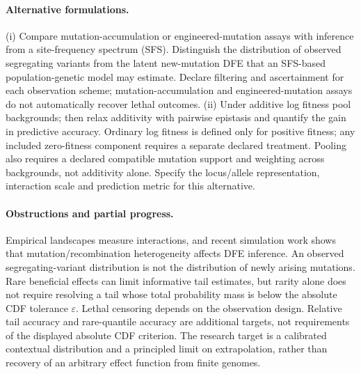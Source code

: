 \documentclass[11pt]{article}
\begin{document}
\paragraph{Alternative formulations.} (i) Compare mutation-accumulation or engineered-mutation assays with inference from a site-frequency spectrum (SFS). Distinguish the distribution of observed segregating variants from the latent new-mutation DFE that an SFS-based population-genetic model may estimate. Declare filtering and ascertainment for each observation scheme; mutation-accumulation and engineered-mutation assays do not automatically recover lethal outcomes. (ii) Under additive log fitness pool backgrounds; then relax additivity with pairwise epistasis and quantify the gain in predictive accuracy. Ordinary log fitness is defined only for positive fitness; any included zero-fitness component requires a separate declared treatment. Pooling also requires a declared compatible mutation support and weighting across backgrounds, not additivity alone. Specify the locus/allele representation, interaction scale and prediction metric for this alternative.
\paragraph{Obstructions and partial progress.} Empirical landscapes measure interactions, and recent simulation work shows that mutation/recombination heterogeneity affects DFE inference. An observed segregating-variant distribution is not the distribution of newly arising mutations. Rare beneficial effects can limit informative tail estimates, but rarity alone does not require resolving a tail whose total probability mass is below the absolute CDF tolerance $\varepsilon$. Lethal censoring depends on the observation design. Relative tail accuracy and rare-quantile accuracy are additional targets, not requirements of the displayed absolute CDF criterion. The research target is a calibrated contextual distribution and a principled limit on extrapolation, rather than recovery of an arbitrary effect function from finite genomes.
\end{document}
